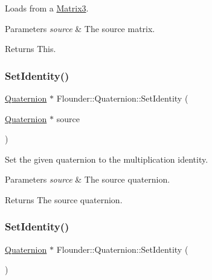 Loads from a \hyperlink{class_flounder_1_1_matrix3}{Matrix3}. 


\begin{DoxyParams}{Parameters}
{\em source} & The source matrix. \\
\hline
\end{DoxyParams}
\begin{DoxyReturn}{Returns}
This. 
\end{DoxyReturn}
\mbox{\label{class_flounder_1_1_quaternion_a2c7a3b1c9f4bf6509401e40d8eab298d}} 
\subsubsection{\texorpdfstring{Set\+Identity()}{SetIdentity()}\hspace{0.1cm}{\footnotesize\ttfamily [1/2]}}
{\footnotesize\ttfamily \hyperlink{class_flounder_1_1_quaternion}{Quaternion} $\ast$ Flounder\+::\+Quaternion\+::\+Set\+Identity (\begin{DoxyParamCaption}\item[{\hyperlink{class_flounder_1_1_quaternion}{Quaternion} $\ast$}]{source }\end{DoxyParamCaption})\hspace{0.3cm}{\ttfamily [static]}}



Set the given quaternion to the multiplication identity. 


\begin{DoxyParams}{Parameters}
{\em source} & The source quaternion. \\
\hline
\end{DoxyParams}
\begin{DoxyReturn}{Returns}
The source quaternion. 
\end{DoxyReturn}
\mbox{\label{class_flounder_1_1_quaternion_a94b5e5eed19489af80203025a4f34f63}} 
\subsubsection{\texorpdfstring{Set\+Identity()}{SetIdentity()}\hspace{0.1cm}{\footnotesize\ttfamily [2/2]}}
{\footnotesize\ttfamily \hyperlink{class_flounder_1_1_quaternion}{Quaternion} $\ast$ Flounder\+::\+Quaternion\+::\+Set\+Identity (\begin{DoxyParamCaption}{ }\end{DoxyParamCaption})}



